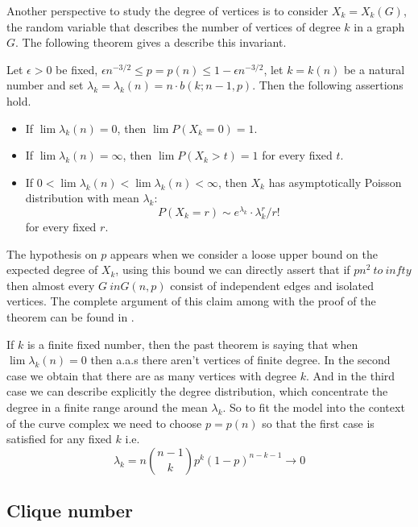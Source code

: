 Another perspective to study the degree of vertices is to consider $X_{k} = X_{k} (G)$, the random variable that describes the number of vertices of degree $k$ in a graph $G$. The following theorem gives a describe this invariant.

\begin{theorem}
Let $\epsilon>0$ be fixed, $\epsilon n^{-3/2} \leq p = p(n) \leq 1 - \epsilon n^{-3/2}$, let $k = k(n)$ be a natural number and set $\lambda_{k} = \lambda_{k}(n) = n\cdot b(k;n - 1,p)$. Then the following assertions hold.

\begin{itemize}
\item If $\lim \lambda_{k}(n) = 0$, then $\lim P(X_{k} = 0) = 1$. 
\item If $\lim \lambda_{k}(n) = \infty$, then $\lim P(X_{k} > t) = 1$
for every fixed $t$.
\item If $0 < \lim\lambda_{k}(n) < \lim \lambda_{k}(n) < \infty$,
then $X_{k}$ has asymptotically Poisson distribution with mean $\lambda_{k}$: 
$$P(X_{k} = r) \sim e^{\lambda_{k}}\cdot \lambda_{k}^{r}/ r!$$
for every fixed $r$.
\end{itemize}
\end{theorem}

The hypothesis on $ p $ appears when we consider a loose upper bound on the expected degree of $ X_ {k} $, using this bound we can directly assert that if $ pn ^ {2} \ to \ infty $ then almost every $ G \ in G (n, p) $ consist of independent edges and isolated vertices. The complete argument of this claim among with the proof of the theorem can be found in \cite[Bollobás, p.61]{Bollobas}.

If $k$ is a finite fixed number, then the past theorem is saying that when $\lim \lambda_{k}(n) = 0$ then a.a.s there aren't vertices of finite degree. In the second case we obtain that there are as many vertices with degree $k$. And in the third case we can describe explicitly the degree distribution, which concentrate the degree in a finite range around the mean $\lambda_{k}$. So to fit the model into the context of the curve complex we need to choose $p = p(n)$ so that the first case is satisfied for any fixed $k$ i.e.
$$\lambda_{k} = n \binom{n-1}{k} p^{k} (1-p)^{n-k-1} \to 0$$

\subsection{Clique number}

